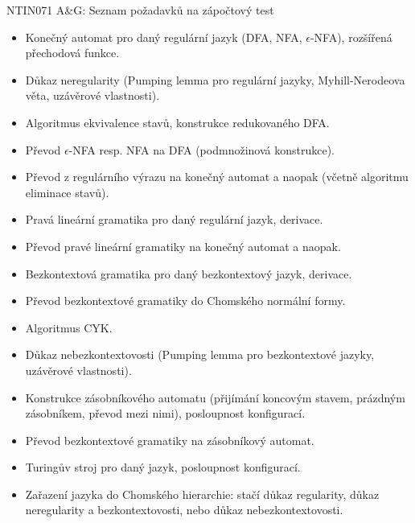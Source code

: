 \documentclass[a4paper,12pt]{article}
\begin{document}
\thispagestyle{empty}

\begin{center}
    \large{NTIN071 A\&G: Seznam požadavků na zápočtový test}    
\end{center}

\bigskip

\begin{itemize}
    \item Konečný automat pro daný regulární jazyk (DFA, NFA, $\epsilon$-NFA), rozšířená přechodová funkce.
    \item Důkaz neregularity (Pumping lemma pro regulární jazyky, Myhill-Nerodeova věta, uzávěrové vlastnosti).
    \item Algoritmus ekvivalence stavů, konstrukce redukovaného DFA.
    \item Převod $\epsilon$-NFA resp. NFA na DFA (podmnožinová konstrukce).
    \item Převod z regulárního výrazu na konečný automat a naopak (včetně algoritmu eliminace stavů).
    \item Pravá lineární gramatika pro daný regulární jazyk, derivace.
    \item Převod pravé lineární gramatiky na konečný automat a naopak.
    \item Bezkontextová gramatika pro daný bezkontextový jazyk, derivace.
    \item Převod bezkontextové gramatiky do Chomského normální formy.
    \item Algoritmus CYK.
    \item Důkaz nebezkontextovosti (Pumping lemma pro bezkontextové jazyky, uzávěrové vlastnosti).
    \item Konstrukce zásobníkového automatu (přijímání koncovým stavem, prázdným zásobníkem, převod mezi nimi), posloupnost konfigurací.
    \item Převod bezkontextové gramatiky na zásobníkový automat.
    \item Turingův stroj pro daný jazyk, posloupnost konfigurací.
    \item Zařazení jazyka do Chomského hierarchie: stačí důkaz regularity, důkaz neregularity a bezkontextovosti, nebo důkaz nebezkontextovosti.
\end{itemize}
\end{document}
